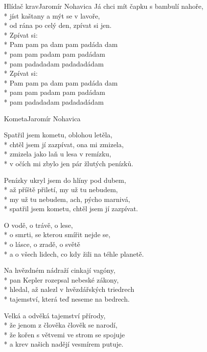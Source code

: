 \documentclass[10.5pt]{book}
\begin{document}
\begin{poem}{Hlídač krav}{Jaromír Nohavica}
Já chci mít čapku s bambulí nahoře,\\*
jíst kaštany a mýt se v lavoře,\\*
od rána po celý den, zpívat si jen.\\*
Zpívat si:\\*
Pam pam pa dam pam padáda dam\\*
pam pam padam pam padádam\\*
pam padadadam padadadádam\\*
Zpívat si:\\*
Pam pam pa dam pam padáda dam\\*
pam pam padam pam padádam\\*
pam padadadam padadadádam

\end{poem}

\begin{poem}{Kometa}{Jaromír Nohavica}

\settowidth{\versewidth}{a o všech lidech, co kdy žili na téhle planetě.}

Spatřil jsem kometu, oblohou letěla,\\*
chtěl jsem jí zazpívat, ona mi zmizela,\\*
zmizela jako laň u lesa v remízku,\\*
v očích mi zbylo jen pár žlutých penízků.

Penízky ukryl jsem do hlíny pod dubem,\\*
až příště přiletí, my už tu nebudem,\\*
my už tu nebudem, ach, pýcho marnivá,\\*
spatřil jsem kometu, chtěl jsem jí zazpívat.

O vodě, o trávě, o lese,\\*
o smrti, se kterou smířit nejde se,\\*
o lásce, o zradě, o světě\\*
a o všech lidech, co kdy žili na téhle planetě.

Na hvězdném nádraží cinkají vagóny,\\*
pan Kepler rozepsal nebeské zákony,\\*
hledal, až nalezl v hvězdářských triedrech\\*
tajemství, která teď neseme na bedrech.

Velká a odvěká tajemství přírody,\\*
že jenom z člověka člověk se narodí,\\*
že kořen s větvemi ve strom se spojuje\\*
a krev našich nadějí vesmírem putuje.


\end{poem}
\end{document}

